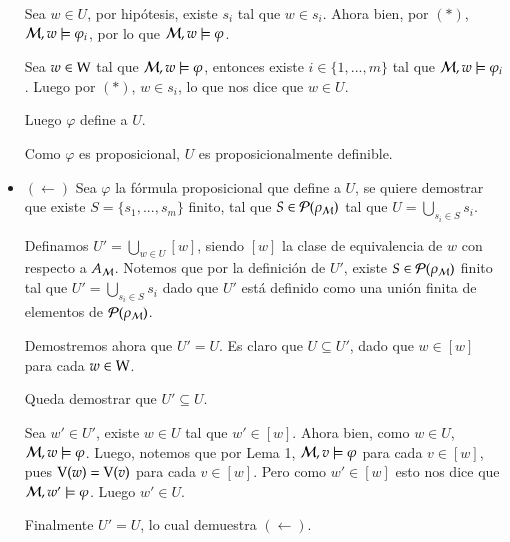 \begin{demostracion}
\begin{itemize}
        Sea $w \in U$, por hipótesis, existe $s_i$ tal que $w \in s_i$. Ahora bien, por $(*)$, $\mathcal{M}, w \models \varphi_i$, por lo que $\mathcal{M}, w \models \varphi$.

        Sea $w \in \mathrm{W}$ tal que $\mathcal{M}, w \models \varphi$, entonces existe $i \in \{1,...,m\}$ tal que $\mathcal{M}, w \models \varphi_i$. Luego por $(*)$, $w \in s_i$, lo que nos dice que $w \in U$.

        Luego $\varphi$ define a $U$.
        
        Como $\varphi$ es proposicional, $U$ es proposicionalmente definible. 
    
        \item $(\leftarrow)$ Sea $\varphi$ la fórmula proposicional que define a $U$, se quiere demostrar que existe $S = \{s_1,...,s_m\}$ finito, tal que $S \in \mathcal{P}(\rho_{\mathcal{M}})$ tal que $U = \bigcup\limits_{s_i \in S} s_{i}$. 

        Definamos $U' = \bigcup\limits_{w \in U} [w]$, siendo $[w]$ la clase de equivalencia de $w$ con respecto a $A_{\mathcal{M}}$. Notemos que por la definición de $U'$, existe $S \in \mathcal{P}(\rho_{\mathcal{M}})$ finito tal que $U' = \bigcup\limits_{s_i \in S} s_{i}$ dado que $U'$ está definido como una unión finita de elementos de $\mathcal{P}(\rho_{\mathcal{M}})$.

        Demostremos ahora que $U' = U$. Es claro que $U \subseteq U'$, dado que $w \in [w]$ para cada $w \in \mathrm{W}$.

        Queda demostrar que $U' \subseteq U$. 
        
        Sea $w' \in U'$, existe $w \in U$ tal que $w' \in [w]$. Ahora bien, como $w \in U$, $\mathcal{M}, w \models \varphi$. Luego, notemos que por Lema 1, $\mathcal{M}, v \models \varphi$ para cada $v \in [w]$, pues $\mathrm{V}(w) = \mathrm{V}(v)$ para cada $v \in [w]$.
        Pero como $w' \in [w]$ esto nos dice que $\mathcal{M}, w' \models \varphi$. Luego $w' \in U$.

        Finalmente $U' = U$, lo cual demuestra $(\leftarrow)$.
    \end{itemize}

\end{demostracion}



